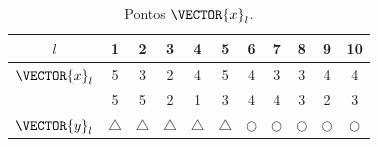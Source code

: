 \begin{table}[h!]
\centering
\begin{tabular}{|c||c|c|c|c|c||c|c|c|c|c||} 
 \hline
$l$            & 1 & 2 & 3 & 4 & 5 & 6 & 7 & 8 & 9 & 10 \\ \hline \hline
$\VECTOR{x}_l$ & 5 & 3 & 2 & 4 & 5 & 4 & 3 & 3 & 4 & 4 \\ 
~              & 5 & 5 & 2 & 1 & 3 & 4 & 4 & 3 & 2 & 3 \\ \hline
$\VECTOR{y}_l$ & $\bigtriangleup$ & $\bigtriangleup$ & $\bigtriangleup$ & $\bigtriangleup$ & $\bigtriangleup$ 
      & $\bigcirc$ & $\bigcirc$ & $\bigcirc$ & $\bigcirc$ & $\bigcirc$\\ \hline
\end{tabular}
\caption{Pontos $\VECTOR{x}_l$.}
\label{table:theo:reglogrnr1poly:ex2:xn}
\end{table}


